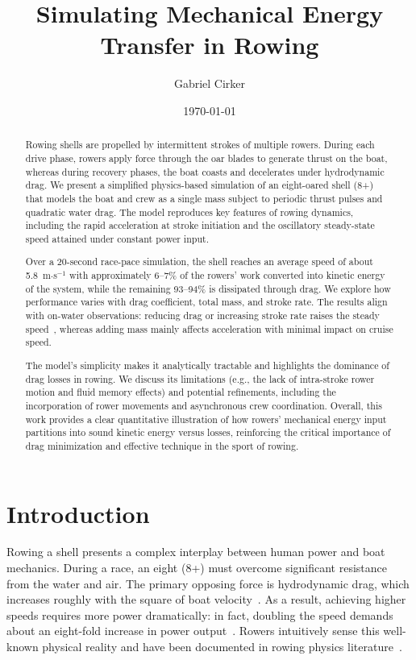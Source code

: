 \documentclass[12pt]{article}
\title{Simulating Mechanical Energy Transfer in Rowing}
\author{Gabriel Cirker}
\date{\today}
\begin{document}
\sloppy

\maketitle

\begin{abstract}
Rowing shells are propelled by intermittent strokes of multiple rowers. During each drive phase, rowers apply force through the oar blades to generate thrust on the boat, whereas during recovery phases, the boat coasts and decelerates under hydrodynamic drag. We present a simplified physics-based simulation of an eight-oared shell (8+) that models the boat and crew as a single mass subject to periodic thrust pulses and quadratic water drag. The model reproduces key features of rowing dynamics, including the rapid acceleration at stroke initiation and the oscillatory steady-state speed attained under constant power input.

Over a 20-second race-pace simulation, the shell reaches an average speed of about 5.8~m$\cdot$s$^{-1}$ with approximately 6–7\% of the rowers’ work converted into kinetic energy of the system, while the remaining 93–94\% is dissipated through drag. We explore how performance varies with drag coefficient, total mass, and stroke rate. The results align with on-water observations: reducing drag or increasing stroke rate raises the steady speed~\cite{rowinginmotion2016, hofmijster2010}, whereas adding mass mainly affects acceleration with minimal impact on cruise speed.

The model’s simplicity makes it analytically tractable and highlights the dominance of drag losses in rowing. We discuss its limitations (e.g., the lack of intra-stroke rower motion and fluid memory effects) and potential refinements, including the incorporation of rower movements and asynchronous crew coordination. Overall, this work provides a clear quantitative illustration of how rowers’ mechanical energy input partitions into sound kinetic energy versus losses, reinforcing the critical importance of drag minimization and effective technique in the sport of rowing.
\end{abstract}



\section{Introduction}

Rowing a shell presents a complex interplay between human power and boat mechanics. During a race, an eight (8+) must overcome significant resistance from the water and air. The primary opposing force is hydrodynamic drag, which increases roughly with the square of boat velocity~\cite{pulman2007}. As a result, achieving higher speeds requires more power dramatically: in fact, doubling the speed demands about an eight-fold increase in power output~\cite{dudhia2000}. Rowers intuitively sense this well-known physical reality and have been documented in rowing physics literature~\cite{dudhia2000, tucklazauskas1996}. 
\end{document}
